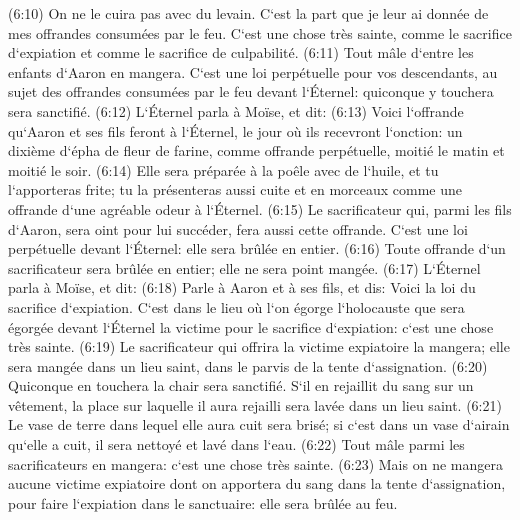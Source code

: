 \verse (6:10) On ne le cuira pas avec du levain. C`est la part que je leur ai donnée de mes offrandes consumées par le feu. C`est une chose très sainte, comme le sacrifice d`expiation et comme le sacrifice de culpabilité. 
\verse (6:11) Tout mâle d`entre les enfants d`Aaron en mangera. C`est une loi perpétuelle pour vos descendants, au sujet des offrandes consumées par le feu devant l`Éternel: quiconque y touchera sera sanctifié. 
\verse (6:12) L`Éternel parla à Moïse, et dit: 
\verse (6:13) Voici l`offrande qu`Aaron et ses fils feront à l`Éternel, le jour où ils recevront l`onction: un dixième d`épha de fleur de farine, comme offrande perpétuelle, moitié le matin et moitié le soir. 
\verse (6:14) Elle sera préparée à la poêle avec de l`huile, et tu l`apporteras frite; tu la présenteras aussi cuite et en morceaux comme une offrande d`une agréable odeur à l`Éternel. 
\verse (6:15) Le sacrificateur qui, parmi les fils d`Aaron, sera oint pour lui succéder, fera aussi cette offrande. C`est une loi perpétuelle devant l`Éternel: elle sera brûlée en entier. 
\verse (6:16) Toute offrande d`un sacrificateur sera brûlée en entier; elle ne sera point mangée. 
\verse (6:17) L`Éternel parla à Moïse, et dit: 
\verse (6:18) Parle à Aaron et à ses fils, et dis: Voici la loi du sacrifice d`expiation. C`est dans le lieu où l`on égorge l`holocauste que sera égorgée devant l`Éternel la victime pour le sacrifice d`expiation: c`est une chose très sainte. 
\verse (6:19) Le sacrificateur qui offrira la victime expiatoire la mangera; elle sera mangée dans un lieu saint, dans le parvis de la tente d`assignation. 
\verse (6:20) Quiconque en touchera la chair sera sanctifié. S`il en rejaillit du sang sur un vêtement, la place sur laquelle il aura rejailli sera lavée dans un lieu saint. 
\verse (6:21) Le vase de terre dans lequel elle aura cuit sera brisé; si c`est dans un vase d`airain qu`elle a cuit, il sera nettoyé et lavé dans l`eau. 
\verse (6:22) Tout mâle parmi les sacrificateurs en mangera: c`est une chose très sainte. 
\verse (6:23) Mais on ne mangera aucune victime expiatoire dont on apportera du sang dans la tente d`assignation, pour faire l`expiation dans le sanctuaire: elle sera brûlée au feu. 

